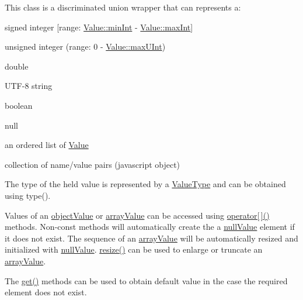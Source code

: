 This class is a discriminated union wrapper that can represents a\+:
\begin{DoxyItemize}
\item signed integer \mbox{[}range\+: \hyperlink{classJson_1_1Value_a7df8a39e2502b8c92a6a41e3d752d2c8}{Value\+::min\+Int} -\/ \hyperlink{classJson_1_1Value_a978c799a8af3114ef7dab6fd0a310a1b}{Value\+::max\+Int}\mbox{]}
\item unsigned integer (range\+: 0 -\/ \hyperlink{classJson_1_1Value_ac79e63ee68d3aa914bfd6988be669b87}{Value\+::max\+U\+Int})
\item double
\item U\+T\+F-\/8 string
\item boolean
\item \textquotesingle{}null\textquotesingle{}
\item an ordered list of \hyperlink{classJson_1_1Value}{Value}
\item collection of name/value pairs (javascript object)
\end{DoxyItemize}

The type of the held value is represented by a \hyperlink{namespaceJson_a7d654b75c16a57007925868e38212b4e}{Value\+Type} and can be obtained using type().

Values of an \hyperlink{namespaceJson_a7d654b75c16a57007925868e38212b4eae8386dcfc36d1ae897745f7b4f77a1f6}{object\+Value} or \hyperlink{namespaceJson_a7d654b75c16a57007925868e38212b4eadc8f264f36b55b063c78126b335415f4}{array\+Value} can be accessed using \hyperlink{classJson_1_1Value_a7d99f5dba388cdaa152ce6ef933d64ef}{operator\mbox{[}$\,$\mbox{]}()} methods. Non-\/const methods will automatically create the a \hyperlink{namespaceJson_a7d654b75c16a57007925868e38212b4ea7d9899633b4409bd3fc107e6737f8391}{null\+Value} element if it does not exist. The sequence of an \hyperlink{namespaceJson_a7d654b75c16a57007925868e38212b4eadc8f264f36b55b063c78126b335415f4}{array\+Value} will be automatically resized and initialized with \hyperlink{namespaceJson_a7d654b75c16a57007925868e38212b4ea7d9899633b4409bd3fc107e6737f8391}{null\+Value}. \hyperlink{classJson_1_1Value_a7a064d8aa47fde09a268be2aea992134}{resize()} can be used to enlarge or truncate an \hyperlink{namespaceJson_a7d654b75c16a57007925868e38212b4eadc8f264f36b55b063c78126b335415f4}{array\+Value}.

The \hyperlink{classJson_1_1Value_a034eb7bf85a44fa759bdaa232788ca66}{get()} methods can be used to obtain default value in the case the required element does not exist.

